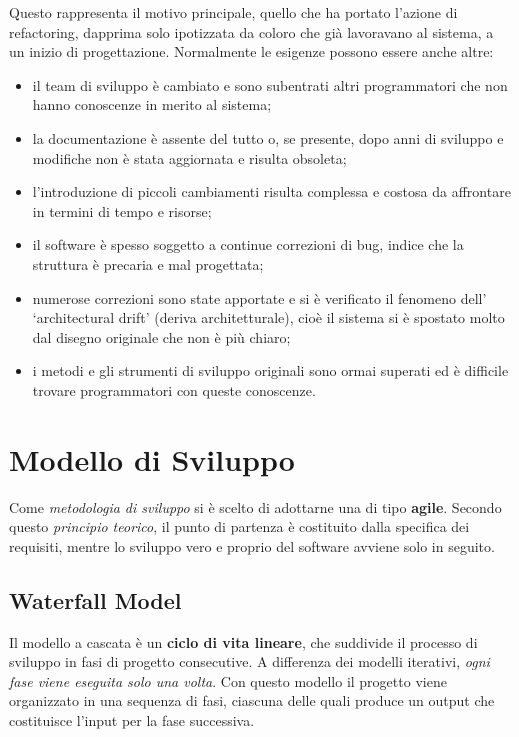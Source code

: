 Questo rappresenta il motivo principale, quello che ha portato l'azione di refactoring, dapprima solo ipotizzata da coloro che già lavoravano al sistema, a un inizio di progettazione. Normalmente le esigenze possono essere anche altre:

\begin{itemize}
    \item il team di sviluppo è cambiato e sono subentrati altri programmatori che non hanno conoscenze in merito al sistema;
    \item la documentazione è assente del tutto o, se presente, dopo anni di sviluppo e modifiche non è stata aggiornata e risulta obsoleta;
    \item  l'introduzione di piccoli cambiamenti risulta complessa e costosa da affrontare in termini di tempo e risorse;
    \item il software è spesso soggetto a continue correzioni di bug, indice che la struttura è precaria e mal progettata;
    \item numerose correzioni sono state apportate e si è verificato il fenomeno dell' `architectural drift' (deriva architetturale), cioè il sistema si è spostato molto dal disegno originale che non è più chiaro;
    \item i metodi e gli strumenti di sviluppo originali sono ormai superati ed è difficile trovare programmatori con queste conoscenze.
\end{itemize}

\section{Modello di Sviluppo}
Come \textit{metodologia di sviluppo} si è scelto di adottarne una di tipo \textbf{agile}. Secondo questo \emph{principio teorico}, il punto di partenza è costituito dalla specifica dei requisiti, mentre lo sviluppo vero e proprio del software avviene solo in seguito.

\subsection{Waterfall Model}
Il modello a cascata è un \textbf{ciclo di vita lineare}, che suddivide il processo di sviluppo in fasi di progetto consecutive. A differenza dei modelli iterativi, \textit{ogni fase viene eseguita solo una volta}. Con questo modello il progetto viene organizzato in una sequenza di fasi, ciascuna delle quali produce un output che costituisce l’input per la fase successiva.

